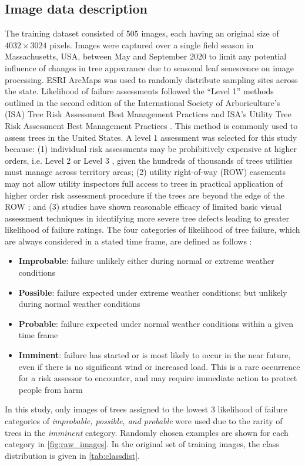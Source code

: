 \documentclass[Journal,letterpaper, SingleSpace, InsideFigs]{ascelike-new}
\begin{document}
\subsection{Image data description}
The training dataset consisted of 505 images, each having an original size of $4032\times3024$ pixels.   Images were captured over a single field season in Massachusetts, USA, between May and September 2020 to limit any potential influence of changes in tree appearance due to seasonal leaf senescence on image processing.  ESRI ArcMaps was used to randomly distribute sampling sites across the state.  Likelihood of failure assessments followed the “Level 1” methods outlined in the second edition of the International Society of Arboriculture’s (ISA) Tree Risk Assessment Best Management Practices \cite{smiley2017best} and ISA’s Utility Tree Risk Assessment Best Management Practices \cite{goodfellow2020best}.  This method is commonly used to assess trees in the United States.  A level 1 assessment was selected for this study because: (1) individual risk assessments may be prohibitively expensive at higher orders, i.e. Level 2 or Level 3 \cite{smiley2017best}, given the hundreds of thousands of trees utilities must manage across territory areas;  (2) utility right-of-way (ROW) easements may not allow utility inspectors full access to trees in practical application of higher order risk assessment procedure if the trees are beyond the edge of the ROW \cite{goodfellow2020best}; and (3) studies have shown reasonable efficacy of limited basic visual assessment techniques in identifying more severe tree defects \cite{rooney2005reliability,koeser2016frequency} leading to greater likelihood of failure ratings.  The four categories of likelihood of tree failure, which are always considered in a stated time frame, are defined as follows \cite{smiley2017best}:
\begin{itemize}
\item \textbf{Improbable}: failure unlikely either during normal or extreme weather conditions 
\item \textbf{Possible}: failure expected under extreme weather conditions; but unlikely during normal weather conditions
\item \textbf{Probable}: failure expected under normal weather conditions within a given time frame
\item \textbf{Imminent}: failure has started or is most likely to occur in the near future, even if there is no significant wind or increased load. This is a rare occurrence for a risk assessor to encounter, and may require immediate action to protect people from harm
\end{itemize}
In this study, only images of trees assigned to the lowest 3 likelihood of failure categories of \textit{improbable, possible, \textit{and} probable} were used due to the rarity of trees in the \textit{imminent} category. Randomly chosen examples are shown for each category in \autoref{fig:raw_images}.   In the original set of training images, the class distribution is given in \autoref{tab:classdist}.
\end{document}
